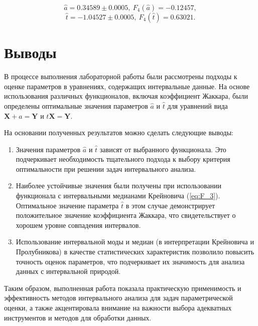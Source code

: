 \documentclass{article}
\begin{document}
  \[ \hat a = 0.34589 \pm 0.0005, \ F_4 (\hat a) = -0.12457, \]
  \[ \hat t = -1.04527 \pm 0.0005, \ F_4 (\hat t) = 0.63021. \]
  \newpage
  \section{Выводы}

  В процессе выполнения лабораторной работы были рассмотрены подходы к оценке параметров в уравнениях, содержащих интервальные данные. На основе использования различных функционалов, включая коэффициент Жаккара, были определены оптимальные значения параметров \( \hat{a} \) и \( \hat{t} \) для уравнений вида \( \mathbf{X} + a = \mathbf{Y} \) и \( t\mathbf{X} = \mathbf{Y} \).
  
  На основании полученных результатов можно сделать следующие выводы:
  
  \begin{enumerate}
      \item Значения параметров \( \hat{a} \) и \( \hat{t} \) зависят от выбранного функционала. Это подчеркивает необходимость тщательного подхода к выбору критерия оптимальности при решении задач интервального анализа.
      \item Наиболее устойчивые значения были получены при использовании функционала с интервальными медианами Крейновича (\ref{eq:F_3}). Оптимальное значение параметра \( \hat{t} \) в этом случае демонстрирует положительное значение коэффициента Жаккара, что свидетельствует о хорошем уровне совпадения интервалов.
      \item Использование интервальной моды и медиан (в интерпретации Крейновича и Пролубникова) в качестве статистических характеристик позволило повысить точность оценок параметров, что подчеркивает их значимость для анализа данных с интервальной природой.
  \end{enumerate}
  
  Таким образом, выполненная работа показала практическую применимость и эффективность методов интервального анализа для задач параметрической оценки, а также акцентировала внимание на важности выбора адекватных инструментов и методов для обработки данных.
\end{document}
